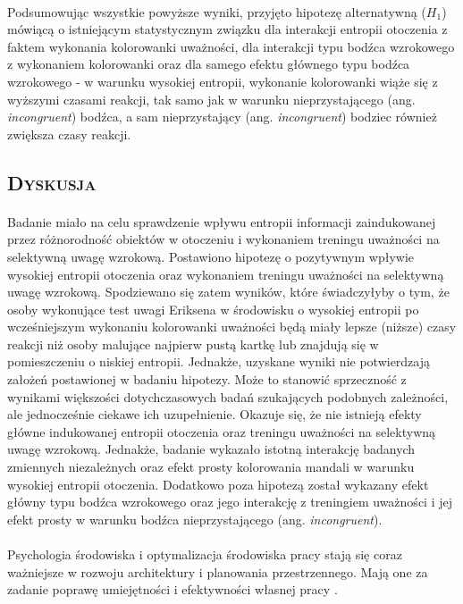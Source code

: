 \documentclass[12pt,a4paper,final,oneside,onecolumn,titlepage]{article}
\begin{document}
\paragraph{}
Podsumowując wszystkie powyższe wyniki, przyjęto hipotezę alternatywną ($H_1$) mówiącą o istniejącym statystycznym związku dla interakcji entropii otoczenia z faktem wykonania kolorowanki uważności, dla interakcji typu bodźca wzrokowego z wykonaniem kolorowanki oraz dla samego efektu głównego typu bodźca wzrokowego - w warunku wysokiej entropii, wykonanie kolorowanki wiąże się z wyższymi czasami reakcji, tak samo jak w warunku nieprzystającego (ang. \textit{incongruent}) bodźca, a sam nieprzystający (ang. \textit{incongruent}) bodziec również zwiększa czasy reakcji.
\begin{center}
\section*{\large{\textbf{\textsc{Dyskusja}}}}
\end{center}
\paragraph{}
Badanie miało na celu sprawdzenie wpływu entropii informacji zaindukowanej przez różnorodność obiektów w otoczeniu i wykonaniem treningu uważności na selektywną uwagę wzrokową. Postawiono hipotezę o pozytywnym wpływie wysokiej entropii otoczenia oraz wykonaniem treningu uważności na selektywną uwagę wzrokową. Spodziewano się zatem wyników, które świadczyłyby o tym, że osoby wykonujące test uwagi Eriksena w środowisku o wysokiej entropii po wcześniejszym wykonaniu kolorowanki uważności będą miały lepsze (niższe) czasy reakcji niż osoby malujące najpierw pustą kartkę lub znajdują się w pomieszczeniu o niskiej entropii. Jednakże, uzyskane wyniki nie potwierdzają założeń postawionej w badaniu hipotezy. Może to stanowić sprzeczność z wynikami większości dotychczasowych badań szukających podobnych zależności, ale jednocześnie ciekawe ich uzupełnienie. Okazuje się, że nie istnieją efekty główne indukowanej entropii otoczenia oraz treningu uważności na selektywną uwagę wzrokową. Jednakże, badanie wykazało istotną interakcję badanych zmiennych niezależnych oraz efekt prosty kolorowania mandali w warunku wysokiej entropii otoczenia. Dodatkowo poza hipotezą został wykazany efekt główny typu bodźca wzrokowego oraz jego interakcję z treningiem uważności i jej efekt prosty w warunku bodźca nieprzystającego (ang. \textit{incongruent}).
\paragraph{}
Psychologia środowiska i optymalizacja środowiska pracy stają się coraz ważniejsze w rozwoju architektury i planowania przestrzennego. Mają one za zadanie poprawę umiejętności i efektywności własnej pracy \citep{banka_psychologia_2018}.
\end{document}
